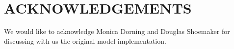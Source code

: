 \documentclass{isprs}
\begin{document}
\section*{ACKNOWLEDGEMENTS}\label{ACKNOWLEDGEMENTS}
We would like to acknowledge Monica Dorning and Douglas Shoemaker
for discussing with us the original model implementation.



\end{document}
